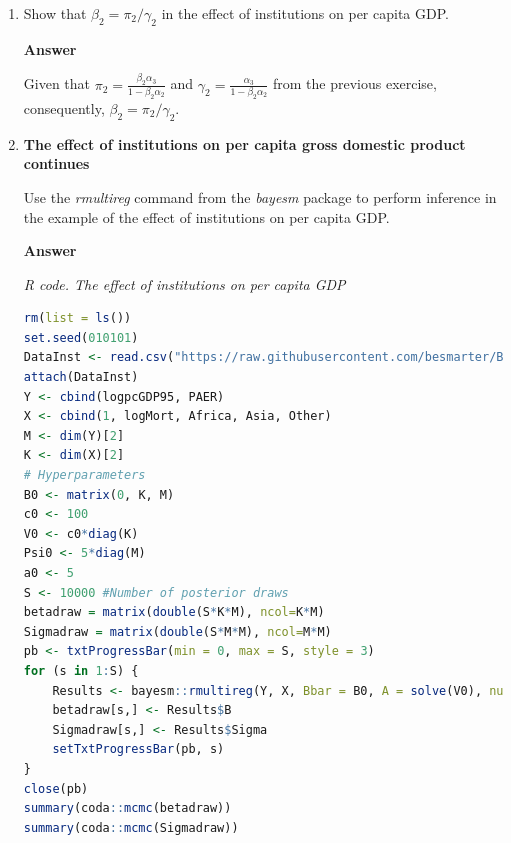 \begin{enumerate}[leftmargin=*]
Then, replacing Equation \ref{eq:red1} into Equation \ref{eq:str2}, and solving for \textit{PAER},
\begin{align}\label{eq:red2}
	\text{PAER}_i=\gamma_1+\gamma_2\log(\text{Mort}_i)+\gamma_3 \text{Africa}+\gamma_4 \text{Asia}+\gamma_5 \text{Other}+e_{2i},
\end{align}
where $\gamma_1=\frac{\alpha_1+\alpha_2\beta_1}{1-\beta_2\alpha_2}$, $\gamma_2=\frac{\alpha_3}{1-\beta_2\alpha_2}$, $\gamma_3=\frac{\alpha_2\beta_3}{1-\beta_2\alpha_2}$, $\gamma_4=\frac{\alpha_2\beta_4}{1-\beta_2\alpha_2}$,
$\gamma_5=\frac{\alpha_2\beta_5}{1-\beta_2\alpha_2}$, and $e_2=\frac{\alpha_2u_1+u_2}{1-\beta_2\alpha_2}$.

Then, $\mathbb{E}[u_1\text{PAER}]=\mathbb{E}\left[u_1(\gamma_1+\gamma_2\log(\text{Mort}_i)+\gamma_3 \text{Africa}+\gamma_4 \text{Asia}+\gamma_5 \text{Other}+e_{2i})\right]=\mathbb{E}\left[u_1\left(\frac{\alpha_2u_1+u_2}{1-\beta_2\alpha_2}\right)\right]=\frac{\alpha_2}{1-\beta_2\alpha_2}\sigma^2_1$ given the assumptions.      

\item Show that $\beta_2=\pi_2/\gamma_2$ in the effect of institutions on per capita GDP.

\textbf{Answer}

Given that $\pi_2=\frac{\beta_2\alpha_3}{1-\beta_2\alpha_2}$ and $\gamma_2=\frac{\alpha_3}{1-\beta_2\alpha_2}$ from the previous exercise, consequently, $\beta_2=\pi_2/\gamma_2$.

\item \textbf{The effect of institutions on per capita gross domestic product continues}

Use the \textit{rmultireg} command from the \textit{bayesm} package to perform inference in the example of the effect of institutions on per capita GDP.

\textbf{Answer}

\begin{tcolorbox}[enhanced,width=4.67in,center upper,
	fontupper=\large\bfseries,drop shadow southwest,sharp corners]
	\textit{R code. The effect of institutions on per capita GDP}
	\begin{VF}
		\begin{lstlisting}[language=R]
rm(list = ls())
set.seed(010101)
DataInst <- read.csv("https://raw.githubusercontent.com/besmarter/BSTApp/refs/heads/master/DataApp/4Institutions.csv", sep = ",", header = TRUE, quote = "")
attach(DataInst)
Y <- cbind(logpcGDP95, PAER)
X <- cbind(1, logMort, Africa, Asia, Other)
M <- dim(Y)[2]
K <- dim(X)[2]
# Hyperparameters
B0 <- matrix(0, K, M)
c0 <- 100
V0 <- c0*diag(K)
Psi0 <- 5*diag(M)
a0 <- 5
S <- 10000 #Number of posterior draws
betadraw = matrix(double(S*K*M), ncol=K*M)
Sigmadraw = matrix(double(S*M*M), ncol=M*M)
pb <- txtProgressBar(min = 0, max = S, style = 3)
for (s in 1:S) {
	Results <- bayesm::rmultireg(Y, X, Bbar = B0, A = solve(V0), nu = a0, V = Psi0)
	betadraw[s,] <- Results$B
	Sigmadraw[s,] <- Results$Sigma
	setTxtProgressBar(pb, s)
}
close(pb)
summary(coda::mcmc(betadraw))
summary(coda::mcmc(Sigmadraw))
\end{lstlisting}
	\end{VF}
\end{tcolorbox} 
 

\end{enumerate}
